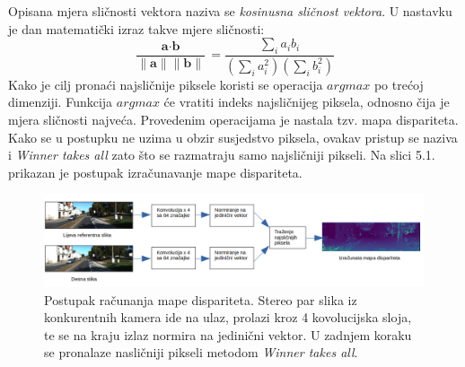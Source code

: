 \documentclass[times, utf8, zavrsni, numeric]{fer}
\begin{document}
Opisana mjera sličnosti vektora naziva se \textit{kosinusna sličnost vektora}. U nastavku je dan matematički izraz takve mjere sličnosti:
\begin{equation}
\frac{\textbf{a}\cdot\textbf{b}}{\parallel\textbf{a}\parallel \parallel\textbf{b}\parallel}=\frac{\sum_{i}a_{i}b_{i}}{(\sum_{i}a_{i}^2)(\sum_{i}b_{i}^2)}
\label{eq:normalizacija}
\end{equation}
Kako je cilj pronaći najsličnije piksele koristi se operacija $argmax$ po trećoj dimenziji. Funkcija $argmax$ će vratiti indeks najsličnijeg piksela, odnosno čija je mjera sličnosti najveća. Provedenim operacijama je nastala tzv. mapa dispariteta. Kako se u postupku ne uzima u obzir susjedstvo piksela, ovakav pristup se naziva i \textit{Winner takes all} zato što se razmatraju samo najsličniji pikseli. Na slici 5.1. prikazan je postupak izračunavanje mape dispariteta.
\begin{figure}[htb]
\centering
\includegraphics[width = 14.5cm]{img/disp_map.png}
\caption{Postupak računanja mape dispariteta. Stereo par slika iz konkurentnih kamera ide na ulaz, prolazi kroz 4 kovolucijska sloja, te se na kraju izlaz normira na jedinični vektor. U zadnjem koraku se pronalaze nasličniji pikseli metodom \textit{Winner takes all}.}
\label{fig:KITTI}
\end{figure}
\pagebreak
\end{document}
